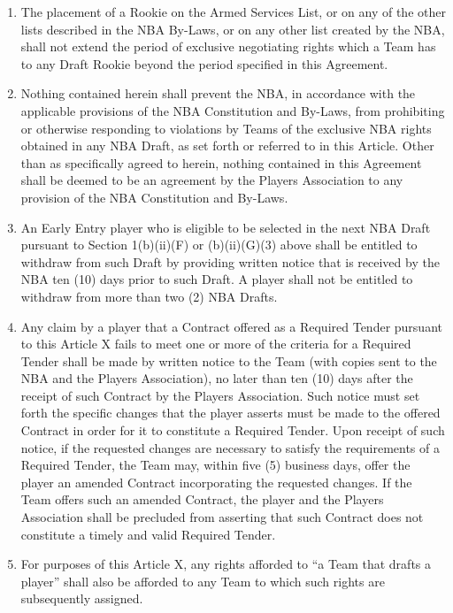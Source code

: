 \documentclass[
]{book}
\providecommand{\tightlist}{%
  \setlength{\itemsep}{0pt}\setlength{\parskip}{0pt}}
\begin{document}
\begin{enumerate}
\def\labelenumi{(\alph{enumi})}
\tightlist
\item
  The placement of a Rookie on the Armed Services List, or on any of the other lists described in the NBA By-Laws, or on any other list created by the NBA, shall not extend the period of exclusive negotiating rights which a Team has to any Draft Rookie beyond the period specified in this Agreement.
\item
  Nothing contained herein shall prevent the NBA, in accordance with the applicable provisions of the NBA Constitution and By-Laws, from prohibiting or otherwise responding to violations by Teams of the exclusive NBA rights obtained in any NBA Draft, as set forth or referred to in this Article. Other than as specifically agreed to herein, nothing contained in this Agreement shall be deemed to be an agreement by the Players Association to any provision of the NBA Constitution and By-Laws.
\item
  An Early Entry player who is eligible to be selected in the next NBA Draft pursuant to Section 1(b)(ii)(F) or (b)(ii)(G)(3) above shall be entitled to withdraw from such Draft by providing written notice that is received by the NBA ten (10) days prior to such Draft. A player shall not be entitled to withdraw from more than two (2) NBA Drafts.
\item
  Any claim by a player that a Contract offered as a Required Tender pursuant to this Article X fails to meet one or more of the criteria for a Required Tender shall be made by written notice to the Team (with copies sent to the NBA and the Players Association), no later than ten (10) days after the receipt of such Contract by the Players Association. Such notice must set forth the specific changes that the player asserts must be made to the offered Contract in order for it to constitute a Required Tender. Upon receipt of such notice, if the requested changes are necessary to satisfy the requirements of a Required Tender, the Team may, within five (5) business days, offer the player an amended Contract incorporating the requested changes. If the Team offers such an amended Contract, the player and the Players Association shall be precluded from asserting that such Contract does not constitute a timely and valid Required Tender.
\item
  For purposes of this Article X, any rights afforded to ``a Team that drafts a player'' shall also be afforded to any Team to which such rights are subsequently assigned.
\end{enumerate}
\end{document}

